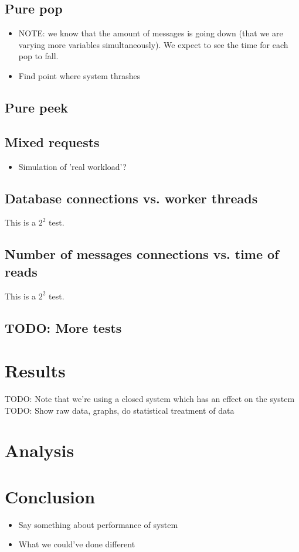 \documentclass{article}
\begin{document}
        \subsection{Pure pop}
        \begin{itemize}
            \item NOTE: we know that the amount of messages is going down (that we are varying more variables simultaneously). We expect to see the time for each pop to fall.
            \item Find point where system thrashes
        \end{itemize}

        \subsection{Pure peek}

        \subsection{Mixed requests}
            \begin{itemize}
                \item Simulation of 'real workload'?
            \end{itemize}

        \subsection{Database connections vs. worker threads}
            This is a $2^2$ test.

        \subsection{Number of messages connections vs. time of reads}
            This is a $2^2$ test.

        \subsection{TODO: More tests}

    \section{Results}
    TODO: Note that we're using a closed system which has an effect on the system
        TODO: Show raw data, graphs, do statistical treatment of data

    \section{Analysis}

    \section{Conclusion}
        \begin{itemize}
            \item Say something about performance of system
            \item What we could've done different
        \end{itemize}
\end{document}
